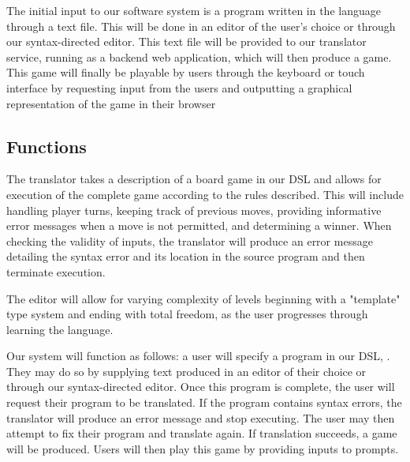 \documentclass[10pt,letter,draftclsnofoot,onecolumn]{IEEEtran}
\begin{document}
\begin{singlespace}
        The initial input to our software system is a program written in the language \name through a text file. This will be done in an editor of the user's choice or through our syntax-directed editor. This text file will be provided to our translator service, running as a backend web application, which will then produce a game. This game will finally be playable by users through the keyboard or touch interface by requesting input from the users and outputting a graphical representation of the game in their browser
        
    \subsection{Functions}
        The translator takes a description of a board game in our DSL and allows for execution of the complete game according to the rules described. This will include handling player turns, keeping track of previous moves, providing informative error messages when a move is not permitted, and determining a winner. When checking the validity of inputs, the translator will produce an error message detailing the syntax error and its location in the source program and then terminate execution. 
        
        The editor will allow for varying complexity of levels beginning with a "template" type system and ending with total freedom, as the user progresses through learning the language. 
        
        Our system will function as follows: a user will specify a program in our DSL, \name. They may do so by supplying text produced in an editor of their choice or through our syntax-directed editor. Once this program is complete, the user will request their program to be translated. If the program contains syntax errors, the translator will produce an error message and stop executing. The user may then attempt to fix their program and translate again. If translation succeeds, a game will be produced. Users will then play this game by providing inputs to prompts.
        

\end{singlespace}
\end{document}
